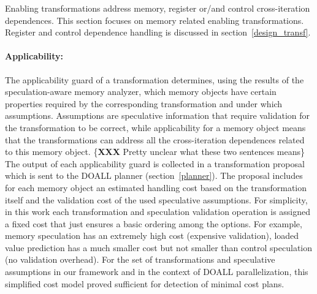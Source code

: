 Enabling transformations address memory, register or/and control
cross-iteration dependences.
%
This section focuses on memory related enabling transformations.
Register and control dependence handling is discussed in
section~\ref{design_transf}.


%
\paragraph{Applicability:}
%
The applicability guard of a transformation determines, using the
results of the speculation-aware memory analyzer,  which memory
objects have certain properties required by the corresponding
transformation and under which assumptions.
%
Assumptions are speculative information that require validation for
the transformation to be correct, while applicability for a memory
object means that the transformations can address all the
cross-iteration dependences related to this memory object. \{\textbf{XXX}
Pretty unclear what these two sentences means\}
%
The output of each applicability guard is collected in a
transformation proposal which is sent to the DOALL
planner (section~\ref{planner}).
%
The proposal includes for each memory object an estimated handling
cost based on the transformation itself and the validation cost of the
used speculative assumptions.
%
%
For simplicity, in this work each transformation and speculation
validation operation is assigned a fixed
cost that just ensures a basic ordering among the options. For
example,
memory speculation has an extremely high cost (expensive validation),
loaded value prediction has a much smaller cost but not smaller than
control speculation (no validation overhead).
%
%
For the set of transformations and speculative assumptions in our
framework and in the context of DOALL parallelization, this simplified
cost model proved sufficient for detection of minimal cost plans.
%

